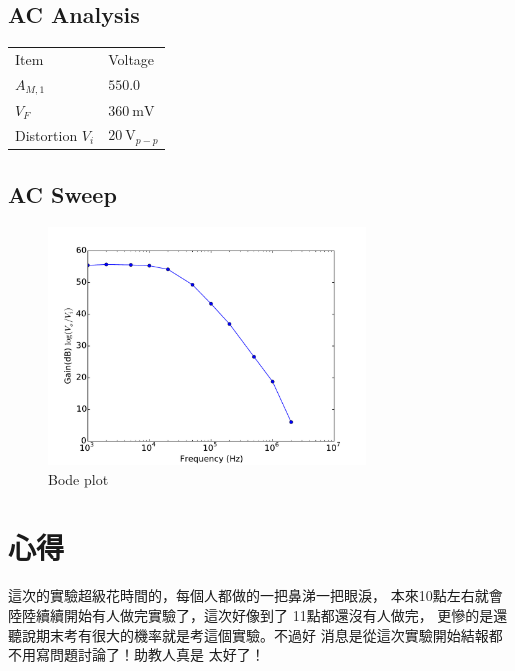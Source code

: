 \documentclass[12pt, a4paper]{article}
\begin{document}
\subsection{AC Analysis}

\begin{center}
  \begin{tabular}{p{4cm}p{4cm}}
	\hline
  Item & Voltage\\
	\hhline{==}
  $A_{M, 1}$ & $550.0$ \\
  $V_F$ & $\SI{360}\mV$ \\
  Distortion $V_i$ & $\SI{20}\V_{p-p}$ \\
	\hline
\end{tabular}
\end{center}

\subsection{AC Sweep}
\vspace*{-0.5cm}
\begin{figure}[H]
\begin{center}
  \includegraphics[width=0.75\textwidth]{fig2.pdf}
\end{center}
\caption{Bode plot}
\label{fig:}
\end{figure}

\section{心得}
這次的實驗超級花時間的，每個人都做的一把鼻涕一把眼淚，
本來10點左右就會陸陸續續開始有人做完實驗了，這次好像到了
11點都還沒有人做完，
更慘的是還聽說期末考有很大的機率就是考這個實驗。不過好
消息是從這次實驗開始結報都不用寫問題討論了！助教人真是
太好了！
\end{document}

